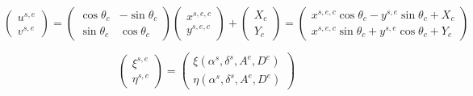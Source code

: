 \documentclass[12pt]{article}
\begin{document}
\footnotesize

\begin{equation}
\left(
\begin{array}{c}
u^{s,e} \\
v^{s,e} 
\end{array}
\right)
=
\left(
\begin{array}{cc}
\cos \theta_c & -\sin \theta_c \\
\sin \theta_c & \cos \theta_c
\end{array}
\right)
\left(
\begin{array}{c}
x^{s,e,c} \\
y^{s,e,c} 
\end{array}
\right)
+
\left(
\begin{array}{c}
X_c \\
Y_c
\end{array}
\right)
=
\left(
\begin{array}{c}
x^{s,e,c}\cos\theta_c-y^{s,e}\sin\theta_c+X_c \\
x^{s,e,c}\sin\theta_c+y^{s,e}\cos\theta_c+Y_c
\end{array}
\right)
\nonumber
\end{equation}

\begin{equation}
\left(
\begin{array}{c}
\xi^{s,e} \\
\eta^{s,e}
\end{array}
\right)
=
\left(
\begin{array}{c}
\xi(\alpha^{s}, \delta^{s}, A^{e}, D^{e}) \\
\eta(\alpha^{s}, \delta^{s}, A^{e}, D^{e})
\end{array}
\right)
\end{equation}
\end{document}
